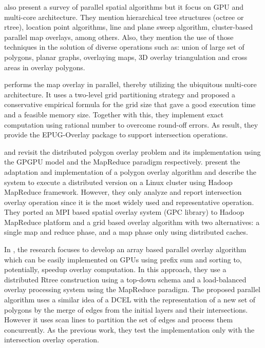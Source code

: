 \cite{franklin_data_2018} also present a survey of parallel spatial algorithms but it focus on GPU and multi-core architecture.  They mention hierarchical tree structures (octree or rtree), location point algorithms, line and plane sweep algorithm, cluster-based parallel map overlays, among others.  Also, they mention the use of those techniques in the solution of diverse operations such as: union of large set of polygons, planar graphs, overlaying maps, 3D overlay triangulation and cross areas in overlay polygons.

\cite{magalhaes_fast_2015} performs the map overlay in parallel, thereby utilizing the ubiquitous multi-core architecture.  It uses a two-level grid partitioning strategy and proposed a conservative empirical formula for the grid size that gave a good execution time and a feasible memory size.  Together with this, they implement exact computation using rational number to overcome round-off errors. As result, they provide the EPUG-Overlay package to support intersection operations.

\cite{puri_efficient_2013} and \cite{puri_mapreduce_2013} revisit the distributed polygon overlay problem and its implementation using the GPGPU model and the MapReduce paradigm respectively.  \cite{puri_mapreduce_2013} present the adaptation and implementation of a polygon overlay algorithm and describe the system to execute a distributed version on a Linux cluster using Hadoop MapReduce framework.  However, they only analyze and report intersection overlay operation since it is the most widely used and representative operation.  They ported an MPI based spatial overlay system (GPC library) to Hadoop MapReduce platform and a grid based overlay algorithm with two alternatives: a single map and reduce phase, and a map phase only using distributed caches.

In \cite{puri_efficient_2013}, the research focuses to develop an array based parallel overlay algorithm which can be easily implemented on GPUs using prefix sum and sorting to,  potentially, speedup overlay computation.  In this approach, they use a distributed Rtree construction using a top-down schema and a load-balanced overlay processing system using the MapReduce paradigm.  The proposed parallel algorithm uses a similar idea of a DCEL with the representation of a new set of polygons by the merge of edges from the initial layers and their intersections.  However it uses scan lines to partition the set of edges and process them concurrently. As the previous work, they test the implementation only with the intersection overlay operation.

